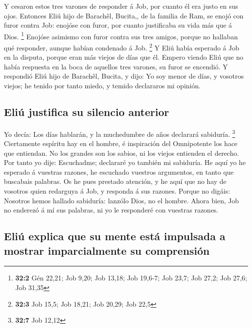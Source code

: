  Y cesaron estos tres varones de responder á Job, por cuanto
él era justo en sus ojos.  Entonces Eliú hijo de Barachêl,
Bucita,, de la familia de Ram, se enojó con furor contra Job: enojóse
con furor, por cuanto justificaba su vida más que á Dios. \footnote{\textbf{32:2}
  Gén 22,21; Job 9,20; Job 13,18; Job 19,6-7; Job 23,7; Job 27,2; Job
  27,6; Job 31,35}  Enojóse asimismo con furor contra sus
tres amigos, porque no hallaban qué responder, aunque habían condenado á
Job. \footnote{\textbf{32:3} Job 15,5; Job 18,21; Job 20,29; Job 22,5}
 Y Eliú había esperado á Job en la disputa, porque eran más
viejos de días que él.  Empero viendo Eliú que no había
respuesta en la boca de aquellos tres varones, su furor se encendió.
 Y respondió Eliú hijo de Barachêl, Bucita, y dijo: Yo soy
menor de días, y vosotros viejos; he tenido por tanto miedo, y temido
declararos mi opinión.

\hypertarget{eliuxfa-justifica-su-silencio-anterior}{%
\subsection{Eliú justifica su silencio
anterior}\label{eliuxfa-justifica-su-silencio-anterior}}

 Yo decía: Los días hablarán, y la muchedumbre de años
declarará sabiduría. \footnote{\textbf{32:7} Job 12,12} 
Ciertamente espíritu hay en el hombre, é inspiración del Omnipotente los
hace que entiendan.  No los grandes son los sabios, ni los
viejos entienden el derecho.  Por tanto yo dije:
Escuchadme; declararé yo también mi sabiduría.  He aquí yo
he esperado á vuestras razones, he escuchado vuestros argumentos, en
tanto que buscabais palabras.  Os he pues prestado
atención, y he aquí que no hay de vosotros quien redarguya á Job, y
responda á sus razones.  Porque no digáis: Nosotros hemos
hallado sabiduría: lanzólo Dios, no el hombre.  Ahora bien,
Job no enderezó á mí sus palabras, ni yo le responderé con vuestras
razones.

\hypertarget{eliuxfa-explica-que-su-mente-estuxe1-impulsada-a-mostrar-imparcialmente-su-comprensiuxf3n}{%
\subsection{Eliú explica que su mente está impulsada a mostrar
imparcialmente su
comprensión}\label{eliuxfa-explica-que-su-mente-estuxe1-impulsada-a-mostrar-imparcialmente-su-comprensiuxf3n}}

